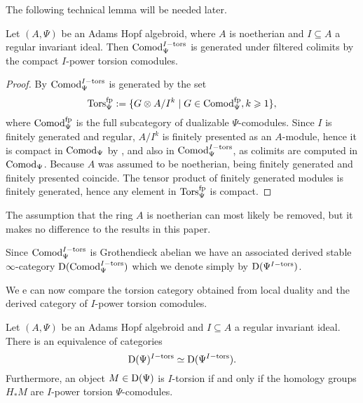 The following technical lemma will be needed later. 

\begin{lemma}
    \label{ch1:lm:torsion-comodules-generated-by-compacts}
    Let $(A,\Psi)$ be an Adams Hopf algebroid, where $A$ is noetherian and $I\subseteq A$ a regular invariant ideal. Then $\mathrm{Comod}_\Psi^{I-\mathrm{tors}}$ is generated under filtered colimits by the compact $I$-power torsion comodules. 
\end{lemma}
\begin{proof}
    By \cite[3.4]{barthel-heard-valenzuela_2020} $\mathrm{Comod}_\Psi^{I-\mathrm{tors}}$ is generated by the set 
    \[\mathrm{Tors}^{\mathrm{fp}}_\Psi:=\{G\otimes A/I^k \mid G \in \mathrm{Comod}^{\mathrm{fp}}_\Psi, k\geqslant 1\},\]
    where $\mathrm{Comod}^{\mathrm{fp}}_\Psi$ is the full subcategory of dualizable $\Psi$-comodules. Since $I$ is finitely generated and regular, $A/I^k$ is finitely presented as an $A$-module, hence it is compact in $\mathrm{Comod}_\Psi$ by \cite[1.4.2]{hovey_04}, and also in $\mathrm{Comod}_\Psi^{I-\mathrm{tors}}$, as colimits are computed in $\mathrm{Comod}_\Psi$. Because $A$ was assumed to be noetherian, being finitely generated and finitely presented coincide. The tensor product of finitely generated modules is finitely generated, hence any element in $\mathrm{Tors}^{\mathrm{fp}}_\Psi$ is compact. 
\end{proof}

\begin{remark}
    The assumption that the ring $A$ is noetherian can most likely be removed, but it makes no difference to the results in this paper.  
\end{remark}

\begin{notation}
    Since $\mathrm{Comod}_\Psi^{I-\mathrm{tors}}$ is Grothendieck abelian we have an associated derived stable $\infty$-category $\mathrm{D}(\mathrm{Comod}_\Psi^{I-\mathrm{tors}})$ which we denote simply by $\mathrm{D}(\Psi^{I-\mathrm{tors}})$.
\end{notation}

We e can now compare the torsion category obtained from local duality and the derived category of $I$-power torsion comodules. 

\begin{lemma}
    \label{ch1:lm:derived-torsion-if-homology-torsion}
    Let $(A,\Psi)$ be an Adams Hopf algebroid and $I\subseteq A$ a regular invariant ideal. There is an equivalence of categories 
    \[\mathrm{D}(\Psi)^{I-\mathrm{tors}}\simeq \mathrm{D}(\Psi^{I-\mathrm{tors}}).\] 
    Furthermore, an object $M\in \mathrm{D}(\Psi)$ is $I$-torsion if and only if the homology groups $H_* M$ are $I$-power torsion $\Psi$-comodules.
\end{lemma}

